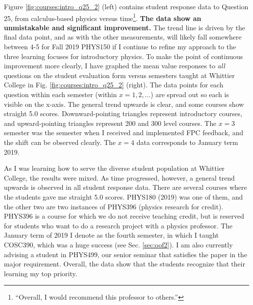 \documentclass[../../main.tex]{subfiles}
\begin{document}
Figure \ref{fig:courses:intro_q25_2} (left) contains student response data to Question 25, from calculus-based physics versus time\footnote{``Overall, I would recommend this professor to others.''}.  \textbf{The data show an unmistakable and significant improvement.}  The trend line is driven by the final data point, and as with the other measurements, will likely fall somewhere between 4-5 for Fall 2019 PHYS150 if I continue to refine my approach to the three learning focuses for introductory physics.  To make the point of continuous improvement more clearly, I have graphed the mean value responses to \textit{all} questions on the student evaluation form versus semesters taught at Whittier College in Fig. \ref{fig:courses:intro_q25_2} (right).  The data points for each question within each semester (within $x=1,2,...$) are spread out so each is visible on the x-axis.  The general trend upwards is clear, and some courses show straight 5.0 scores.  Downward-pointing triangles represent introductory courses, and upward-pointing triangles represent 200 and 300 level courses.  The $x=3$ semester was the semester when I received and implemented FPC feedback, and the shift can be observed clearly.  The $x=4$ data corresponds to January term 2019.  \\ \hspace{0.1cm}

As I was learning how to serve the diverse student population at Whittier College, the results were mixed.  As time progressed, however, a general trend upwards is observed in all student response data.  There are several courses where the students gave me straight 5.0 scores.  PHYS180 (2019) was one of them, and the other two are two instances of PHYS396 (physics research for credit).  PHYS396 is a course for which we do not receive teaching credit, but is reserved for students who want to do a research project with a physics professor.  The January term of 2019 I denote as the fourth semester, in which I taught COSC390, which was a huge success (see Sec. \ref{sec:oof2}).  I am also currently advising a student in PHYS499, our senior seminar that satisfies the paper in the major requirement.  Overall, the data show that the students recognize that their learning my top priority.  \\ \hspace{0.1cm}
\end{document}
